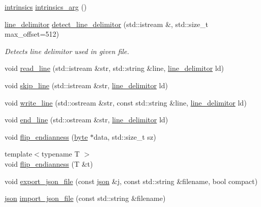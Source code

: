 \begin{DoxyCompactItemize}
\item 
\hyperlink{structtlz_1_1intrinsics}{intrinsics} \hyperlink{namespacetlz_a170805c7a8ede64a93e0ee23196e5b7c}{intrinsics\+\_\+arg} ()
\item 
\hyperlink{namespacetlz_a9643974618d6e98138d9b009f5f6123d}{line\+\_\+delimitor} \hyperlink{namespacetlz_ab101d0ce024c59a97e86f22ae025b073}{detect\+\_\+line\+\_\+delimitor} (std\+::istream \&, std\+::size\+\_\+t max\+\_\+offset=512)
\begin{DoxyCompactList}\small\item\em Detects line delimitor used in given file. \end{DoxyCompactList}\item 
void \hyperlink{namespacetlz_a539629dfec76af8b466f904f4b44163f}{read\+\_\+line} (std\+::istream \&str, std\+::string \&line, \hyperlink{namespacetlz_a9643974618d6e98138d9b009f5f6123d}{line\+\_\+delimitor} ld)
\item 
void \hyperlink{namespacetlz_ad751f045b05eab91faec1abdc6c1848f}{skip\+\_\+line} (std\+::istream \&str, \hyperlink{namespacetlz_a9643974618d6e98138d9b009f5f6123d}{line\+\_\+delimitor} ld)
\item 
void \hyperlink{namespacetlz_a4e9cdc9ca668d5050a9dfbfd7d60437d}{write\+\_\+line} (std\+::ostream \&str, const std\+::string \&line, \hyperlink{namespacetlz_a9643974618d6e98138d9b009f5f6123d}{line\+\_\+delimitor} ld)
\item 
void \hyperlink{namespacetlz_ab1d9ef738ca24791409c5af520dff3e6}{end\+\_\+line} (std\+::ostream \&str, \hyperlink{namespacetlz_a9643974618d6e98138d9b009f5f6123d}{line\+\_\+delimitor} ld)
\item 
void \hyperlink{namespacetlz_ad134248963f7c5229eb03a238cb88b17}{flip\+\_\+endianness} (\hyperlink{namespacetlz_afbec730d64767e794a689352d41b2b18}{byte} $\ast$data, std\+::size\+\_\+t sz)
\item 
{\footnotesize template$<$typename T $>$ }\\void \hyperlink{namespacetlz_a12f7eba952e631efe7e5a85bf27157a4}{flip\+\_\+endianness} (T \&t)
\item 
void \hyperlink{namespacetlz_ab98de0b10e3e079dee189f81adc638a0}{export\+\_\+json\+\_\+file} (const \hyperlink{namespacetlz_ac400657dfcddf6309a769aefc23eed0c}{json} \&j, const std\+::string \&filename, bool compact)
\item 
\hyperlink{namespacetlz_ac400657dfcddf6309a769aefc23eed0c}{json} \hyperlink{namespacetlz_aa1be9362f548fcf9378e1fc9074089c4}{import\+\_\+json\+\_\+file} (const std\+::string \&filename)

\end{DoxyCompactItemize}
